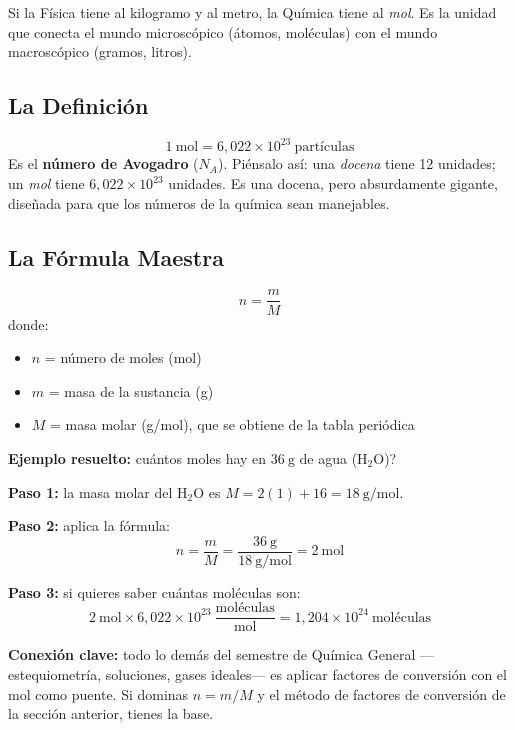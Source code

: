 \documentclass[12pt, letterpaper]{article}
\begin{document}
Si la Física tiene al kilogramo y al metro, la Química tiene al \emph{mol}. Es la unidad que conecta el mundo microscópico (átomos, moléculas) con el mundo macroscópico (gramos, litros).

\subsection{La Definición}

\begin{cuadroteoria}
  \[
    1\ \text{mol} = 6{,}022 \times 10^{23}\ \text{partículas}
  \]
  Es el \textbf{número de Avogadro} ($N_A$). Piénsalo así: una \emph{docena} tiene 12 unidades; un \emph{mol} tiene $6{,}022 \times 10^{23}$ unidades. Es una docena, pero absurdamente gigante, diseñada para que los números de la química sean manejables.
\end{cuadroteoria}

\subsection{La Fórmula Maestra}

\begin{cuadrosolucion}
  \[
    n = \frac{m}{M}
  \]
  donde:
  \begin{itemize}[leftmargin=*]
    \item $n$ = número de moles (mol)
    \item $m$ = masa de la sustancia (g)
    \item $M$ = masa molar (g/mol), que se obtiene de la tabla periódica
  \end{itemize}
\end{cuadrosolucion}

\begin{cuadropasos}
  \textbf{Ejemplo resuelto:} \textquestiondown cuántos moles hay en $36\ \text{g}$ de agua (H$_2$O)?

  \textbf{Paso 1:} la masa molar del H$_2$O es $M = 2(1) + 16 = 18\ \text{g/mol}$.

  \textbf{Paso 2:} aplica la fórmula:
  \[
    n = \frac{m}{M} = \frac{36\ \text{g}}{18\ \text{g/mol}} = 2\ \text{mol}
  \]

  \textbf{Paso 3:} si quieres saber cuántas moléculas son:
  \[
    2\ \text{mol} \times 6{,}022 \times 10^{23}\ \frac{\text{moléculas}}{\text{mol}}
    = 1{,}204 \times 10^{24}\ \text{moléculas}
  \]
\end{cuadropasos}

\begin{cuadroteoria}
  \textbf{Conexión clave:} todo lo demás del semestre de Química General —estequiometría, soluciones, gases ideales— es aplicar factores de conversión con el mol como puente. Si dominas $n = m/M$ y el método de factores de conversión de la sección anterior, tienes la base.
\end{cuadroteoria}
\end{document}
